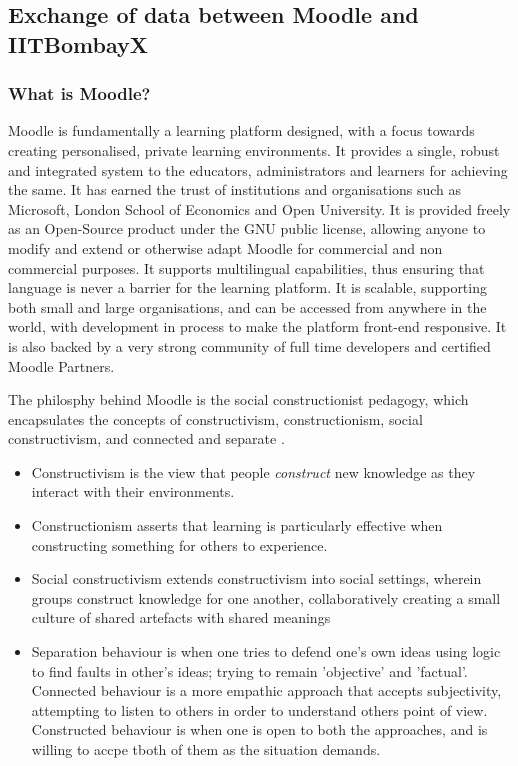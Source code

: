 \documentclass[14pt]{article}
\begin{document}
\subsection{Exchange of data between Moodle and IITBombayX}

\subsubsection{What is Moodle?}
Moodle \cite{Moodle} is fundamentally a learning platform designed, with a focus towards creating personalised, private learning environments. It provides a single, robust and integrated system to the educators, administrators and learners for achieving the same. It has earned the trust of institutions and organisations such as Microsoft, London School of Economics and Open University. It is provided freely as an Open-Source product under the GNU public license, allowing anyone to modify and extend or otherwise adapt Moodle for commercial and non commercial purposes. It supports multilingual capabilities, thus ensuring that language is never a barrier for the learning platform. It is scalable, supporting both small and large organisations, and can be accessed from anywhere in the world, with development in process to make the platform front-end responsive. It is also backed by a very strong community of full time developers and certified Moodle Partners.

The philosphy behind Moodle is the social constructionist pedagogy, which encapsulates the concepts of constructivism, constructionism, social constructivism, and connected and separate \cite{MoodlePhilosophy}. 

\begin{itemize}
\item Constructivism is the view that people \emph{construct} new knowledge as they interact with their environments. 
\item Constructionism asserts that learning is particularly effective when constructing something for others to experience.
\item Social constructivism extends constructivism into social settings, wherein groups construct knowledge for one another, collaboratively creating a small culture of shared artefacts with shared meanings
\item Separation behaviour is when one tries to defend one's own ideas using logic to find faults in other's ideas; trying to remain 'objective' and 'factual'. Connected behaviour is a more empathic approach that accepts subjectivity, attempting to listen to others in order to understand others point of view. Constructed behaviour is when one is open to both the approaches, and is willing to accpe tboth of them as the situation demands.
\end{itemize}
\end{document}

